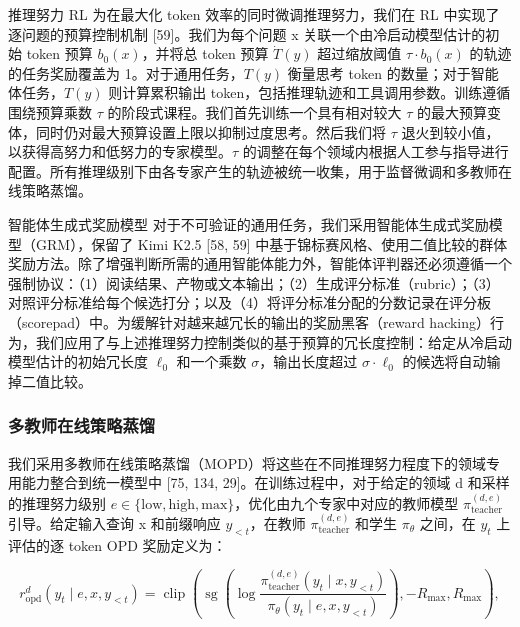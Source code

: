\documentclass[
  10
]{article}
\begin{document}
推理努力 RL 为在最大化 token 效率的同时微调推理努力，我们在 RL 中实现了逐问题的预算控制机制 {[}59{]}。我们为每个问题 x 关联一个由冷启动模型估计的初始 token 预算 \(b _ { 0 } ( x )\)，并将总 token 预算 \(\dot { T } ( y )\) 超过缩放阈值 \(\tau \cdot b _ { 0 } ( x )\) 的轨迹的任务奖励覆盖为 1。对于通用任务，\(T ( y )\) 衡量思考 token 的数量；对于智能体任务，\(T ( y )\) 则计算累积输出 token，包括推理轨迹和工具调用参数。训练遵循围绕预算乘数 $\tau$ 的阶段式课程。我们首先训练一个具有相对较大 $\tau$ 的最大预算变体，同时仍对最大预算设置上限以抑制过度思考。然后我们将 $\tau$ 退火到较小值，以获得高努力和低努力的专家模型。$\tau$ 的调整在每个领域内根据人工参与指导进行配置。所有推理级别下由各专家产生的轨迹被统一收集，用于监督微调和多教师在线策略蒸馏。

智能体生成式奖励模型 对于不可验证的通用任务，我们采用智能体生成式奖励模型（GRM），保留了 Kimi K2.5 {[}58, 59{]} 中基于锦标赛风格、使用二值比较的群体奖励方法。除了增强判断所需的通用智能体能力外，智能体评判器还必须遵循一个强制协议：（1）阅读结果、产物或文本输出；（2）生成评分标准（rubric）；（3）对照评分标准给每个候选打分；以及（4）将评分标准分配的分数记录在评分板（scorepad）中。为缓解针对越来越冗长的输出的奖励黑客（reward hacking）行为，我们应用了与上述推理努力控制类似的基于预算的冗长度控制：给定从冷启动模型估计的初始冗长度 \(\ell _ { 0 }\) 和一个乘数 $\sigma$，输出长度超过 \(\sigma \cdot \ell _ { 0 }\) 的候选将自动输掉二值比较。

\subsubsection{多教师在线策略蒸馏}\label{multi-teacher-on-policy-distillation}

我们采用多教师在线策略蒸馏（MOPD）将这些在不同推理努力程度下的领域专用能力整合到统一模型中 {[}75, 134, 29{]}。在训练过程中，对于给定的领域 d 和采样的推理努力级别 \(e \in \{ \mathrm { l o w } , \mathrm { h i g h } , \mathrm { m a x } \}\)，优化由九个专家中对应的教师模型 \(\pi _ { \mathrm { t e a c h e r } } ^ { ( d , e ) }\) 引导。给定输入查询 x 和前缀响应 \(y _ { < t }\)，在教师 \(\pi _ { \mathrm { t e a c h e r } } ^ { ( d , e ) }\) 和学生 \(\pi _ { \theta }\) 之间，在 \(y _ { t }\) 上评估的逐 token OPD 奖励定义为：

\[
r _ {\mathrm{opd}} ^ {d} (y _ {t} \mid e, x, y _ {<   t}) = \operatorname{clip} \left(\operatorname{sg} \left(\log \frac {\pi_ {\text {teacher}} ^ {(d , e)} (y _ {t} \mid x , y _ {<   t})}{\pi_ {\theta} (y _ {t} \mid e , x , y _ {<   t})}\right), - R _ {\max}, R _ {\max}\right),\tag{15}
\]
\end{document}
